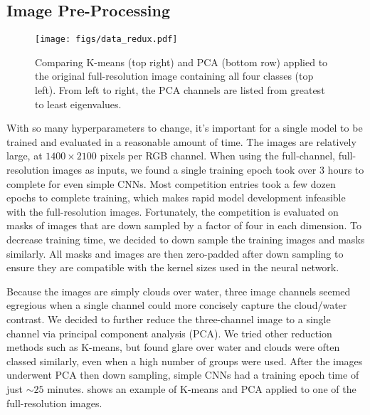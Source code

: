 \subsection{Image Pre-Processing}
\begin{figure}[htbp]
    \centering
    \texttt{[image: figs/data\_redux.pdf]}
    \caption{Comparing K-means (top right) and PCA (bottom row) applied to the original full-resolution image containing all four classes (top left). From left to right, the PCA channels are listed from greatest to least eigenvalues.}
    \label{fig:PCA}
\end{figure}
%
With so many hyperparameters to change, it's important for a single model to be trained and evaluated in a reasonable amount of time. The images are relatively large, at \(1400 \times 2100\) pixels per RGB channel. When using the full-channel, full-resolution images as inputs, we found a single training epoch took over 3 hours to complete for even simple CNNs. Most competition entries took a few dozen epochs to complete training, which makes rapid model development infeasible with the full-resolution images. Fortunately, the competition is evaluated on masks of images that are down sampled by a factor of four in each dimension. To decrease training time, we decided to down sample the training images and masks similarly. All masks and images are then zero-padded after down sampling to ensure they are compatible with the kernel sizes used in the neural network. 

Because the images are simply clouds over water, three image channels seemed egregious when a single channel could more concisely capture the cloud/water contrast. We decided to further reduce the three-channel image to a single channel via principal component analysis (PCA). We tried other reduction methods such as K-means, but found glare over water and clouds were often classed similarly, even when a high number of groups were used. After the images underwent PCA then down sampling, simple CNNs had a training epoch time of just \(\sim25\) minutes.  shows an example of K-means and PCA applied to one of the full-resolution images. 

